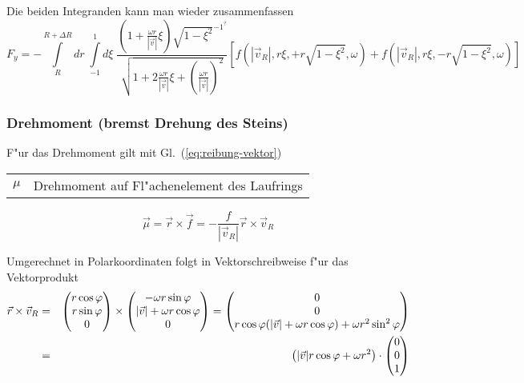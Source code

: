 \documentclass[a4paper]{report}
\newcommand{\eqlab}[1]{\label{eq:#1}}
\newcommand{\eqref}[1]{Gl.~(\ref{eq:#1})}
\newcommand{\vRo}{ \vec{v}   }   %
\newcommand{\vRi}{ \vec{v}_R }   %
\newcommand{\vRiAbsDivvRoXI}[1]{\sqrt{\displaystyle
    1 + 2\frac{\omega #1}{|\vRo|}\xi +
    \left( \frac{\omega #1}{|\vRo|} \right)^2 } }
\newcommand{\SubstCos}{ \sqrt{1-\xi^2} }
\newcommand{\fpolar}[2]{ f( |\vRi| , #2 \xi, #1 #2 \SubstCos ,\omega) }
\newcommand{\Int}{\int\limits}
\begin{document}
Die beiden Integranden kann man wieder zusammenfassen
%
\begin{equation}
F_y =  -\Int_{R}^{R+\Delta R} dr \; \Int_{-1}^{1} d\xi \;
    \frac{ \left( 1 + \frac{\omega r}{|\vRo|}\xi \right)   \SubstCos^{-1^?}
         }{ \vRiAbsDivvRoXI{r}  }
    \left[ \fpolar{+}{r} + \fpolar{-}{r} \right]
    \eqlab{kraft-y}
\end{equation}

\subsubsection{Drehmoment (bremst Drehung des Steins)}

F"ur das Drehmoment gilt mit \eqref{reibung-vektor}

\begin{tabular}{@{}ll}
$ \mu $   & Drehmoment auf Fl"achenelement des Laufrings
\end{tabular}

\begin{equation}
\vec{\mu} = \vec{r}\times \vec{f} = -\frac{f}{|\vRi|}\vec{r}\times\vec{v}_R
	\eqlab{dreh-vektor}
\end{equation}

Umgerechnet in Polarkoordinaten folgt in Vektorschreibweise f"ur das
Vektorprodukt
%
\begin{eqnarray}
\vec{r}\times\vec{v}_R &=& \left(\begin{array}{@{}c@{}}
	r\cos\varphi \\ r\sin\varphi \\ 0
\end{array}\right) \times
\left(\begin{array}{@{}c@{}}
	-\omega r\sin\varphi \\ |\vRo| + \omega r\cos\varphi \\ 0
\end{array}\right) =
\left(\begin{array}{@{}c@{}}
	0 \\ 0 \\ r\cos\varphi(|\vRo|+\omega r\cos\varphi) +
                  \omega r^2\sin^2\varphi
\end{array}\right) \\
&=& \left( |\vRo| r \cos\varphi + \omega r^2 \right) \cdot
    \left(\begin{array}{@{}c@{}} 0 \\ 0 \\ 1 \end{array}\right) \nonumber
\end{eqnarray}
\end{document}

